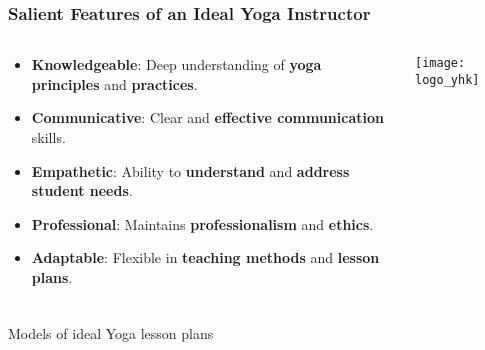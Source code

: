 \begin{frame}[fragile]\frametitle{Salient Features of an Ideal Yoga Instructor}
\begin{columns}
    \begin{column}[T]{0.5\linewidth}
      \begin{itemize}
        \item \textbf{Knowledgeable}: Deep understanding of \textbf{yoga principles} and \textbf{practices}.
        \item \textbf{Communicative}: Clear and \textbf{effective communication} skills.
        \item \textbf{Empathetic}: Ability to \textbf{understand} and \textbf{address student needs}.
        \item \textbf{Professional}: Maintains \textbf{professionalism} and \textbf{ethics}.
        \item \textbf{Adaptable}: Flexible in \textbf{teaching methods} and \textbf{lesson plans}.
      \end{itemize}
    \end{column}
    \begin{column}[T]{0.5\linewidth}
        \begin{center}
        \texttt{[image: logo\_yhk]}
        \end{center}	
    \end{column}
\end{columns}
\end{frame}


\begin{frame}[fragile]\frametitle{}
\begin{center}
{\Large Models of ideal Yoga lesson plans}
\end{center}
\end{frame}

